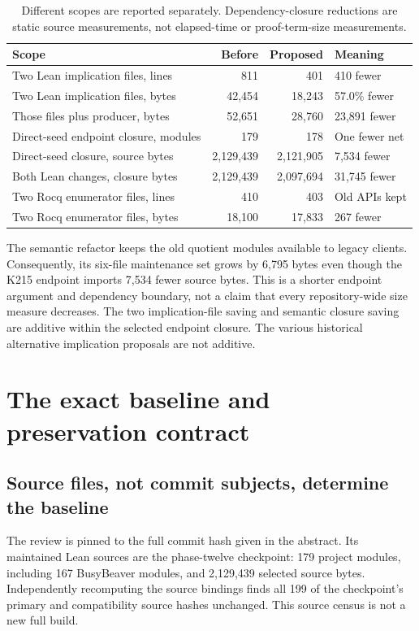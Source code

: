 \documentclass[11pt,letterpaper]{article}
\begin{document}
\begin{table}[ht]
\centering\small
\begin{tabular}{@{}p{2.42in}rrp{1.15in}@{}}
\toprule
Scope & Before & Proposed & Meaning \\
\midrule
Two Lean implication files, lines & 811 & 401 & 410 fewer \\
Two Lean implication files, bytes & 42,454 & 18,243 & 57.0\% fewer \\
Those files plus producer, bytes & 52,651 & 28,760 & 23,891 fewer \\
Direct-seed endpoint closure, modules & 179 & 178 & One fewer net \\
Direct-seed closure, source bytes & 2,129,439 & 2,121,905 & 7,534 fewer \\
Both Lean changes, closure bytes & 2,129,439 & 2,097,694 & 31,745 fewer \\
Two Rocq enumerator files, lines & 410 & 403 & Old APIs kept \\
Two Rocq enumerator files, bytes & 18,100 & 17,833 & 267 fewer \\
\bottomrule
\end{tabular}
\caption{Different scopes are reported separately. Dependency-closure reductions
are static source measurements, not elapsed-time or proof-term-size measurements.}
\end{table}

The semantic refactor keeps the old quotient modules available to legacy clients.
Consequently, its six-file maintenance set grows by 6,795 bytes even though the K215
endpoint imports 7,534 fewer source bytes. This is a shorter endpoint argument and
dependency boundary, not a claim that every repository-wide size measure decreases.
The two implication-file saving and semantic closure saving are additive within the
selected endpoint closure. The various historical alternative implication proposals
are not additive.

\section{The exact baseline and preservation contract}

\subsection{Source files, not commit subjects, determine the baseline}

The review is pinned to the full commit hash given in the abstract. Its maintained
Lean sources are the phase-twelve checkpoint: 179 project modules, including 167
BusyBeaver modules, and 2,129,439 selected source bytes. Independently recomputing
the source bindings finds all 199 of the checkpoint's primary and compatibility
source hashes unchanged. This source census is not a new full build.
\end{document}
